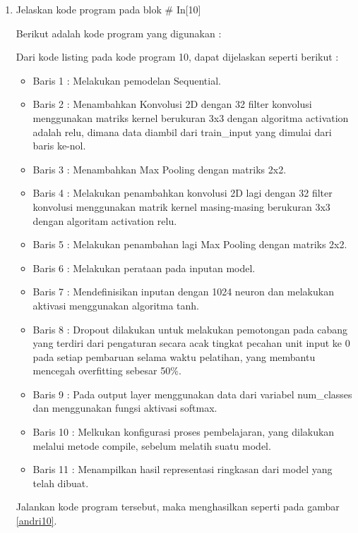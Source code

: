 \begin{enumerate}
\item Jelaskan kode program pada blok \# In[10]
\par Berikut adalah kode program yang digunakan :
	
	\par Dari kode listing pada kode program 10, dapat dijelaskan seperti berikut :
	\begin{itemize}
	\item Baris 1	: Melakukan pemodelan Sequential.
	\item Baris 2	: Menambahkan Konvolusi 2D dengan 32 filter konvolusi menggunakan matriks kernel berukuran 3x3 dengan algoritma activation adalah relu, dimana data diambil dari train\_input yang dimulai dari baris ke-nol.
	\item Baris 3	: Menambahkan Max Pooling dengan matriks 2x2.
	\item Baris 4	: Melakukan penambahkan konvolusi 2D lagi dengan 32 filter konvolusi menggunakan matrik kernel masing-masing berukuran 3x3 dengan algoritam activation relu.
	\item Baris 5	: Melakukan penambahan lagi Max Pooling dengan matriks 2x2.
	\item Baris 6	: Melakukan perataan pada inputan model.
	\item Baris 7	: Mendefinisikan inputan dengan 1024 neuron dan melakukan aktivasi menggunakan algoritma tanh.
	\item Baris 8	: Dropout dilakukan untuk melakukan pemotongan pada cabang yang terdiri dari pengaturan secara acak tingkat pecahan unit input ke 0 pada setiap pembaruan selama waktu pelatihan, yang membantu mencegah overfitting sebesar 50\%.
	\item Baris 9	: Pada output layer menggunakan data dari variabel num\_classes dan menggunakan fungsi aktivasi softmax.
	\item Baris 10 	: Melkukan konfigurasi proses pembelajaran, yang dilakukan melalui metode compile, sebelum melatih suatu model.
	\item Baris 11	: Menampilkan hasil representasi ringkasan dari model yang telah dibuat.
	\end{itemize}
	\par Jalankan kode program tersebut, maka menghasilkan seperti pada gambar \ref{andri10}.
		\begin{figure}[!hbtp]
		\centering

\end{figure}
\end{enumerate}
